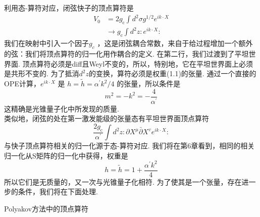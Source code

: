 利用态-算符对应，闭弦快子的顶点算符是
\begin{equation}\label{3.6.1}
	\begin{aligned}
		V_{0} &=2 g_{\mathrm{c}} \int d^{2} \sigma g^{1 / 2} e^{i k \cdot X} \\
		& \rightarrow g_{\mathrm{c}} \int d^{2} z: e^{i k \cdot X}:
	\end{aligned}
\end{equation}
我们在映射中引入一个因子$g_c$ ，这是闭弦耦合常数，来自于给过程增加一个额外的弦：我们将顶点算符的归一化用作耦合的定义. 在第二行，我们过渡到了平坦世界面. 顶点算符必须是diff且Weyl不变的，所以，特别地，它在平坦世界面上必须是共形不变的. 为了抵消$d^2 z$的变换，算符必须是权重(1.1)的张量. 通过一个直接的OPE计算，$e^{i k \cdot X}$ 是 $h=\tilde{h}=\alpha^{\prime} k^{2} / 4$ 的张量，所以条件是
\begin{equation}
	m^{2}=-k^{2}=-\frac{4}{\alpha^{\prime}}
\end{equation}
这精确是光锥量子化中所发现的质量.\\
类似地，闭弦的处在第一激发能级的张量态有平坦世界面顶点算符
\begin{equation}
\frac{2 g_{\mathrm{c}}}{\alpha^{\prime}} \int d^{2} z: \partial X^{\mu} \bar{\partial} X^{v} e^{i k \cdot X}:
\end{equation}
与快子顶点算符相关的归一化源于态-算符对应. 我们将在第6章看到，相同的相关归一化从S矩阵的归一化中获得，权重是
\begin{equation}
h=\tilde{h}=1+\frac{\alpha^{\prime} k^{2}}{4}
\end{equation}
所以它们是无质量的，又一次与光锥量子化相符. 为了使其是一个张量，存在进一步的条件，我们将在下面处理.\\

\centerline{\Large Polyakov方法中的顶点算符}

